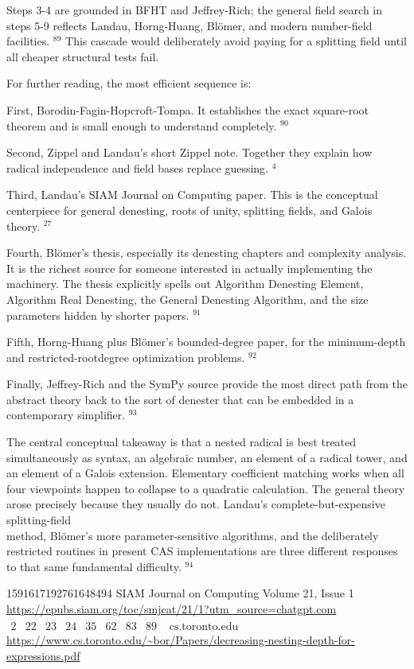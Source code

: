 \documentclass[10pt]{article}
\begin{document}
Steps 3-4 are grounded in BFHT and Jeffrey-Rich; the general field search in steps 5-9 reflects Landau, Horng-Huang, Blömer, and modern number-field facilities. ${ }^{89}$ This cascade would deliberately avoid paying for a splitting field until all cheaper structural tests fail.

For further reading, the most efficient sequence is:

First, Borodin-Fagin-Hopcroft-Tompa. It establishes the exact square-root theorem and is small enough to understand completely. ${ }^{90}$

Second, Zippel and Landau's short Zippel note. Together they explain how radical independence and field bases replace guessing. ${ }^{4}$

Third, Landau's SIAM Journal on Computing paper. This is the conceptual centerpiece for general denesting, roots of unity, splitting fields, and Galois theory. ${ }^{27}$

Fourth, Blömer's thesis, especially its denesting chapters and complexity analysis. It is the richest source for someone interested in actually implementing the machinery. The thesis explicitly spells out Algorithm Denesting Element, Algorithm Real Denesting, the General Denesting Algorithm, and the size parameters hidden by shorter papers. ${ }^{91}$

Fifth, Horng-Huang plus Blömer's bounded-degree paper, for the minimum-depth and restricted-rootdegree optimization problems. ${ }^{92}$

Finally, Jeffrey-Rich and the SymPy source provide the most direct path from the abstract theory back to the sort of denester that can be embedded in a contemporary simplifier. ${ }^{93}$

The central conceptual takeaway is that a nested radical is best treated simultaneously as syntax, an algebraic number, an element of a radical tower, and an element of a Galois extension. Elementary coefficient matching works when all four viewpoints happen to collapse to a quadratic calculation. The general theory arose precisely because they usually do not. Landau's complete-but-expensive splitting-field\\
method, Blömer's more parameter-sensitive algorithms, and the deliberately restricted routines in present CAS implementations are three different responses to that same fundamental difficulty. ${ }^{94}$

1591617192761648494 SIAM Journal on Computing Volume 21, Issue 1 \href{https://epubs.siam.org/toc/smjcat/21/1?utm_source=chatgpt.com}{https://epubs.siam.org/toc/smjcat/21/1?utm\_source=chatgpt.com}\\
$\begin{array}{lllllllll}2 & 22 & 23 & 24 & 35 & 62 & 83 & 89 & \text { cs.toronto.edu }\end{array}$ \href{https://www.cs.toronto.edu/~bor/Papers/decreasing-nesting-depth-for-expressions.pdf}{https://www.cs.toronto.edu/\~{}bor/Papers/decreasing-nesting-depth-for-expressions.pdf}
\end{document}
